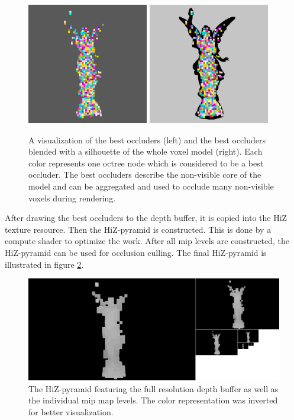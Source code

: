\begin{figure}[h]
    \centering
    \includegraphics[width=200px]{images/graphics/lucy-best-occluders-viz.jpg}
    \includegraphics[width=200px]{images/graphics/lucy-best-occluders-diff-viz.jpg}
    \caption{A visualization of the best occluders (left) and the best occluders blended with a silhouette 
    of the whole voxel model (right). Each color represents one octree node which is considered to be a best occluder.
    The best occluders describe the non-visible core of the model and can be aggregated and used to occlude 
    many non-visible voxels during rendering.}
    \label{fig:best-occluder-viz}
\end{figure}

\noindent 
After drawing the best occluders to the depth buffer, it is copied into the \ac{HiZ} texture resource. 
Then the \ac{HiZ}-pyramid is constructed. This is done by a compute shader to optimize the work. After all mip 
levels are constructed, the \ac{HiZ}-pyramid can be used for occlusion culling. The final \ac{HiZ}-pyramid is 
illustrated in figure \ref{fig:lucy-hiz-pyramid}.

\begin{figure}[h]
    \centering
    \includegraphics[width=\linewidth]{images/graphics/lucy-hiz-pyramid-inverted.jpg}
    \caption{The \ac{HiZ}-pyramid featuring the full resolution depth buffer as well as the individual mip map 
    levels. The color representation was inverted for better visualization.}
    \label{fig:lucy-hiz-pyramid}
\end{figure}

